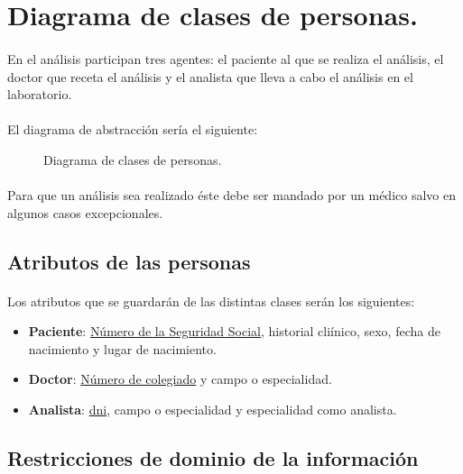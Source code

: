 \documentclass[a4paper,10pt]{article}
\begin{document}
\section{Diagrama de clases de personas.}
\paragraph{}
En el análisis participan tres agentes: el paciente al que se realiza el análisis, el doctor que receta el análisis y el analista que lleva a cabo el análisis en el laboratorio.
\paragraph{}
El diagrama de abstracción sería el siguiente:
\vspace{0.5cm}
\begin{center}
	\begin{figure}[hbt]
		\begin{center}
			\scalebox{.5}{}
		\end{center}
		\caption{Diagrama de clases de personas.}
		\label{fig:diagramapersonas}
	\end{figure}
\end{center}
\paragraph{}
Para que un análisis sea realizado éste debe ser mandado por un médico salvo en algunos casos excepcionales.
\subsection{Atributos de las personas}

\paragraph{}
Los atributos que se guardarán de las distintas clases serán los siguientes:
\begin{itemize}
	\item {\bf Paciente}: \underline{Número de la Seguridad Social}, historial cliínico, sexo, fecha de nacimiento y lugar de nacimiento.
	\item {\bf Doctor}: \underline{Número de colegiado} y campo o especialidad.
	\item {\bf Analista}: \underline{dni}, campo o especialidad y especialidad como analista.
\end{itemize}
\pagebreak
\subsection{Restricciones de dominio de la información}
\end{document}

